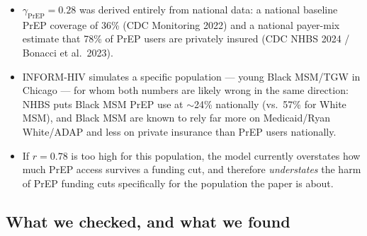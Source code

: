 \documentclass[12pt]{article}
\begin{document}
\begin{itemize}
  \item $\gamma_{\text{PrEP}} = 0.28$ was derived entirely from national data:
    a national baseline PrEP coverage of 36\% (CDC Monitoring 2022) and a
    national payer-mix estimate that 78\% of PrEP users are privately insured
    (CDC NHBS 2024 / Bonacci et al.\ 2023).
  \item INFORM-HIV simulates a specific population --- young Black MSM/TGW in
    Chicago --- for whom both numbers are likely wrong in the same direction:
    NHBS puts Black MSM PrEP use at $\sim$24\% nationally (vs.\ 57\% for White
    MSM), and Black MSM are known to rely far more on Medicaid/Ryan
    White/ADAP and less on private insurance than PrEP users nationally.
  \item If $r=0.78$ is too high for this population, the model currently
    overstates how much PrEP access survives a funding cut, and therefore
    \emph{understates} the harm of PrEP funding cuts specifically for the
    population the paper is about.
\end{itemize}

\subsection{What we checked, and what we found}
\end{document}
